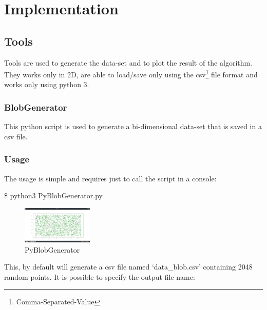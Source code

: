 \documentclass[10pt,twocolumn,letterpaper]{article}
\newenvironment{Shaded}{}{}
\newcommand{\ExtensionTok}[1]{#1}
\newcommand{\NormalTok}[1]{#1}
\begin{document}
\section{Implementation}
\subsection{Tools}
Tools are used to generate the data-set and to plot the result of the algorithm.\newline
They works only in 2D, are able to load/save only using the csv\footnote{Comma-Separated-Value} file format and works only using python 
3.
\subsubsection{BlobGenerator}
This python script is used to generate a bi-dimensional data-set that is saved in a csv file.\newline
\subsubsection{Usage}
The usage is simple and requires just to call the script in a console:\newline
\begin{Shaded}
\begin{Highlighting}[]
\NormalTok{\$ }\ExtensionTok{python3}\NormalTok{ PyBlobGenerator.py }
\end{Highlighting}
\end{Shaded}

\begin{figure}[H]
\centering
\includegraphics[width=0.3\textwidth]{Py_Blob_Generator}
\caption{PyBlobGenerator}
\end{figure}

This, by default will generate a csv file named `data\_blob.csv' containing 2048 random points.\newline
It is possible to specify the output file name:\newline
\end{document}
